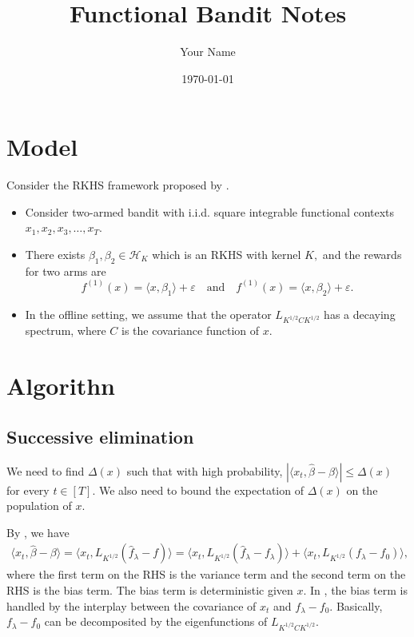 \documentclass[11pt,a4paper]{article}
\title{Functional Bandit Notes}
\author{Your Name}
\date{\today}
\theoremstyle{definition}
\theoremstyle{plain}
\theoremstyle{remark}
\begin{document}
	
\section{Model}
Consider the RKHS framework proposed by \cite{cai2012minimax}.
\begin{itemize}
 \item Consider two-armed bandit with i.i.d. square integrable functional contexts \(x_1,x_2,x_3,\ldots,x_T\).
 \item There exists $\beta_1,\beta_2\in \mathcal{H}_K$ which is an RKHS with kernel $K,$ and the rewards for two arms are
 \[f^{(1)}(x) = \langle x,\beta_1\rangle+\varepsilon \quad\text{and}\quad f^{(1)}(x) = \langle x,\beta_2\rangle+\varepsilon. \]
 \item In the offline setting, we assume that the operator $L_{K^{1/2} C K^{1/2}}$ has a decaying spectrum, where $C$ is the covariance function of $x.$
\end{itemize}
\section{Algorithn}
\subsection{Successive elimination}
	We need to find $\Delta(x)$ such that with high probability, $|\langle x_t, \hat{\beta}-\beta\rangle|\leq \Delta(x)$ for every $t\in [T].$ We also need to bound the expectation of $\Delta(x)$ on the population of $x.$

By \cite{cai2012minimax}, we have
\begin{align*}
	\langle x_t, \hat{\beta}-\beta\rangle = \langle x_t, L_{K^{1/2}} (\hat{f}_{\lambda}-f)\rangle
=\langle x_t, L_{K^{1/2}} (\hat{f}_{\lambda}-f_{\lambda})\rangle
+\langle x_t, L_{K^{1/2}} ({f}_{\lambda}-f_0)\rangle,
\end{align*}
where the first term on the RHS is the variance term and the second term on the RHS is the bias term.
The bias term is deterministic given $x.$ In \cite{cai2012minimax}, the bias term is handled by the interplay between  the covariance of $x_t$ and $f_\lambda-f_0.$ Basically, $f_\lambda-f_0$ can be decomposited by the eigenfunctions of $L_{K^{1/2}CK^{1/2}}.$ 
%	
	


	
\end{document}
